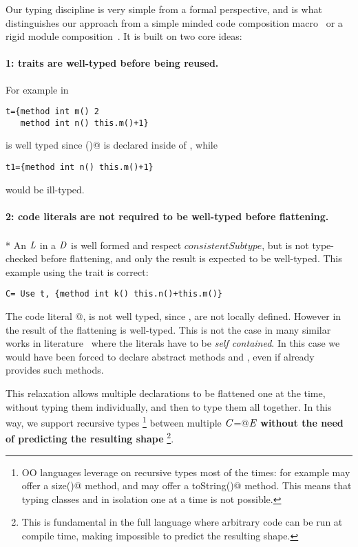 Our typing discipline is very simple from a formal perspective,  
and is what distinguishes our approach from a simple minded code composition macro~\cite{bawden1999quasiquotation}
or a rigid module composition~\cite{ancona2002calculus}. 
It is built on two core ideas:

\paragraph{1: traits are \textbf{well-typed} before being reused.}
 For example in

\saveSpace\begin{lstlisting}
t={method int m() 2 
   method int n() this.m()+1}
\end{lstlisting}\saveSpace

\noindent \Q@t@ is well typed since \Q@m()@ is declared inside of \Q@t@, while

\saveSpace\begin{lstlisting}
t1={method int n() this.m()+1} 
\end{lstlisting}\saveSpace
\noindent would be ill-typed.

\paragraph{2: code literals are \textbf{not required to be well-typed} before flattening.}${}_{}$\\*
An $\mathit{L}$ in a $\mathit{D}$
is well formed and respect $\mathit{consistentSubtype}$, but
is not type-checked before flattening,
and only the result is expected to be well-typed.
This example using the trait \Q@t@ is correct:

\saveSpace\begin{lstlisting}
C= Use t, {method int k() this.n()+this.m()}
\end{lstlisting}\saveSpace

\noindent The code literal
@, 
is not well typed,
since \Q@n@, \Q@m@ are not locally defined. However in 
\name the result of the flattening is well-typed.
This is not the case in many similar works in literature~\cite{deep,Bettini2015282,Bergel2007} where the
literals have to be \emph{self contained}. In this case we would have been forced to
declare abstract methods \Q@n@ and \Q@m@, even if \Q@t@ already 
provides such methods.

This relaxation allows multiple declarations to be flattened one at the time, without typing them individually, and then to type them all together.
In this way, we support recursive types%
\footnote{
OO languages leverage on recursive types most of the times:
for example \Q@String@ may offer a \Q@Int size()@
method, and \Q@Int@ may offer a \Q@String toString()@ method.
This means that typing classes 
\Q@String@ and \Q@Int@ in isolation one at a time is not possible.}
between multiple $\mathit{C}$\Q@=@$\mathit{E}$ \textbf{without
the need of predicting the resulting shape}%
\footnote{This is fundamental in the full language where arbitrary code can be run at compile time, making impossible to predict the resulting shape.}.

